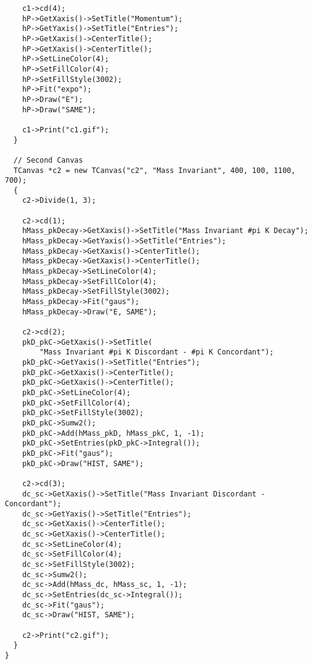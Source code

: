 \begin{lstlisting}
    c1->cd(4);
    hP->GetXaxis()->SetTitle("Momentum");
    hP->GetYaxis()->SetTitle("Entries");
    hP->GetXaxis()->CenterTitle();
    hP->GetXaxis()->CenterTitle();
    hP->SetLineColor(4);
    hP->SetFillColor(4);
    hP->SetFillStyle(3002);
    hP->Fit("expo");
    hP->Draw("E");
    hP->Draw("SAME");

    c1->Print("c1.gif");
  }

  // Second Canvas
  TCanvas *c2 = new TCanvas("c2", "Mass Invariant", 400, 100, 1100, 700);
  {
    c2->Divide(1, 3);

    c2->cd(1);
    hMass_pkDecay->GetXaxis()->SetTitle("Mass Invariant #pi K Decay");
    hMass_pkDecay->GetYaxis()->SetTitle("Entries");
    hMass_pkDecay->GetXaxis()->CenterTitle();
    hMass_pkDecay->GetXaxis()->CenterTitle();
    hMass_pkDecay->SetLineColor(4);
    hMass_pkDecay->SetFillColor(4);
    hMass_pkDecay->SetFillStyle(3002);
    hMass_pkDecay->Fit("gaus");
    hMass_pkDecay->Draw("E, SAME");

    c2->cd(2);
    pkD_pkC->GetXaxis()->SetTitle(
        "Mass Invariant #pi K Discordant - #pi K Concordant");
    pkD_pkC->GetYaxis()->SetTitle("Entries");
    pkD_pkC->GetXaxis()->CenterTitle();
    pkD_pkC->GetXaxis()->CenterTitle();
    pkD_pkC->SetLineColor(4);
    pkD_pkC->SetFillColor(4);
    pkD_pkC->SetFillStyle(3002);
    pkD_pkC->Sumw2();
    pkD_pkC->Add(hMass_pkD, hMass_pkC, 1, -1);
    pkD_pkC->SetEntries(pkD_pkC->Integral());
    pkD_pkC->Fit("gaus");
    pkD_pkC->Draw("HIST, SAME");

    c2->cd(3);
    dc_sc->GetXaxis()->SetTitle("Mass Invariant Discordant - Concordant");
    dc_sc->GetYaxis()->SetTitle("Entries");
    dc_sc->GetXaxis()->CenterTitle();
    dc_sc->GetXaxis()->CenterTitle();
    dc_sc->SetLineColor(4);
    dc_sc->SetFillColor(4);
    dc_sc->SetFillStyle(3002);
    dc_sc->Sumw2();
    dc_sc->Add(hMass_dc, hMass_sc, 1, -1);
    dc_sc->SetEntries(dc_sc->Integral());
    dc_sc->Fit("gaus");
    dc_sc->Draw("HIST, SAME");

    c2->Print("c2.gif");
  }
}
\end{lstlisting}